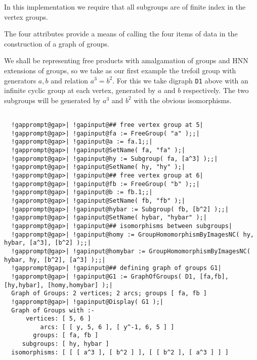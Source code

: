 \documentclass[a4paper,11pt]{report}
\begin{document}
{{{ In this implementation we require that all subgroups are of finite index in
the vertex groups. 

 The four attributes provide a means of calling the four items of data in the
construction of a graph of groups. 

 We shall be representing free products with amalgamation of groups and HNN
extensions of groups, so we take as our first example the trefoil group with
generators $a,b$ and relation $a^3=b^2$. For this we take digraph \texttt{D1} above with an infinite cyclic group at each vertex, generated by $a$ and $b$ respectively. The two subgroups will be generated by $a^3$ and $b^2$ with the obvious isomorphisms. 

 }

 
\begin{Verbatim}[commandchars=!@|,fontsize=\small,frame=single,label=Example]
  
  !gapprompt@gap>| !gapinput@## free vertex group at 5|
  !gapprompt@gap>| !gapinput@fa := FreeGroup( "a" );;|
  !gapprompt@gap>| !gapinput@a := fa.1;;|
  !gapprompt@gap>| !gapinput@SetName( fa, "fa" );|
  !gapprompt@gap>| !gapinput@hy := Subgroup( fa, [a^3] );;|
  !gapprompt@gap>| !gapinput@SetName( hy, "hy" );|
  !gapprompt@gap>| !gapinput@## free vertex group at 6|
  !gapprompt@gap>| !gapinput@fb := FreeGroup( "b" );;|
  !gapprompt@gap>| !gapinput@b := fb.1;;|
  !gapprompt@gap>| !gapinput@SetName( fb, "fb" );|
  !gapprompt@gap>| !gapinput@hybar := Subgroup( fb, [b^2] );;|
  !gapprompt@gap>| !gapinput@SetName( hybar, "hybar" );|
  !gapprompt@gap>| !gapinput@## isomorphisms between subgroups|
  !gapprompt@gap>| !gapinput@homy := GroupHomomorphismByImagesNC( hy, hybar, [a^3], [b^2] );;|
  !gapprompt@gap>| !gapinput@homybar := GroupHomomorphismByImagesNC( hybar, hy, [b^2], [a^3] );;|
  !gapprompt@gap>| !gapinput@## defining graph of groups G1|
  !gapprompt@gap>| !gapinput@G1 := GraphOfGroups( D1, [fa,fb], [hy,hybar], [homy,homybar] );|
  Graph of Groups: 2 vertices; 2 arcs; groups [ fa, fb ]
  !gapprompt@gap>| !gapinput@Display( G1 );|
  Graph of Groups with :-
      vertices: [ 5, 6 ]
          arcs: [ [ y, 5, 6 ], [ y^-1, 6, 5 ] ]
        groups: [ fa, fb ]
     subgroups: [ hy, hybar ]
  isomorphisms: [ [ [ a^3 ], [ b^2 ] ], [ [ b^2 ], [ a^3 ] ] ]
  
\end{Verbatim}
 

}}
\end{document}
